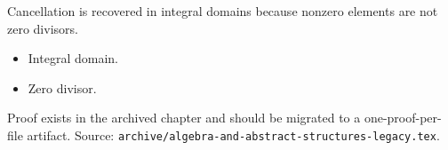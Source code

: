 \begin{remark*}[Interpretation]
Cancellation is recovered in integral domains because nonzero elements are not
zero divisors.
\end{remark*}

\begin{remark*}[Dependencies]
\begin{itemize}
  \item Integral domain.
  \item Zero divisor.
\end{itemize}
\end{remark*}

\begin{remark*}
Proof exists in the archived chapter and should be migrated to a
one-proof-per-file artifact.
Source: \texttt{archive/algebra-and-abstract-structures-legacy.tex}.
\end{remark*}
